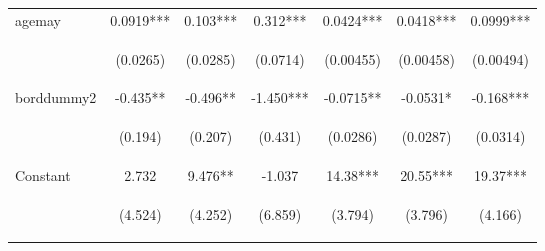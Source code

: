 \documentclass{article}[11pt,subeqn]
\begin{document}
\begin{spacing}{1.25}
\begin{sidewaystable}[!htbp]
\begin{center}
\begin{tabular}{lcccccc}
agemay	&	0.0919***	&	0.103***	&	0.312***	&	0.0424***	&	0.0418***	&	0.0999***	\\
\vspace{4pt}	&	 \begin{footnotesize}(0.0265) \end{footnotesize}	&	 \begin{footnotesize}(0.0285) \end{footnotesize}	&	 \begin{footnotesize}(0.0714) \end{footnotesize}	&	 \begin{footnotesize}(0.00455) \end{footnotesize}	&	 \begin{footnotesize}(0.00458) \end{footnotesize}	&	 \begin{footnotesize}(0.00494) \end{footnotesize}	\\
borddummy2	&	-0.435**	&	-0.496**	&	-1.450***	&	-0.0715**	&	-0.0531*	&	-0.168***	\\
\vspace{4pt}	&	 \begin{footnotesize}(0.194) \end{footnotesize}	&	 \begin{footnotesize}(0.207) \end{footnotesize}	&	 \begin{footnotesize}(0.431) \end{footnotesize}	&	 \begin{footnotesize}(0.0286) \end{footnotesize}	&	 \begin{footnotesize}(0.0287) \end{footnotesize}	&	 \begin{footnotesize}(0.0314) \end{footnotesize}	\\
Constant	&	2.732	&	9.476**	&	-1.037	&	14.38***	&	20.55***	&	19.37***	\\
	&	 \begin{footnotesize}(4.524) \end{footnotesize}	&	 \begin{footnotesize}(4.252) \end{footnotesize}	&	 \begin{footnotesize}(6.859) \end{footnotesize}	&	 \begin{footnotesize}(3.794) \end{footnotesize}	&	 \begin{footnotesize}(3.796) \end{footnotesize}	&	 \begin{footnotesize}(4.166) \end{footnotesize}	\\

\end{tabular}
\end{center}
\end{sidewaystable}
\end{spacing}
\end{document}
